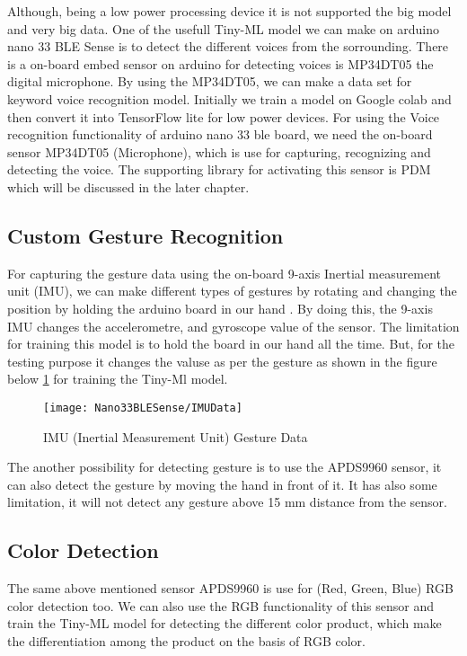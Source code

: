 Although, being a low power processing device it is not supported the big model and very big data. One of the usefull Tiny-ML model we can make on arduino nano 33 BLE Sense is to detect the different voices from the sorrounding. There is a on-board embed sensor on arduino for detecting voices is MP34DT05 the digital microphone. By using the MP34DT05, we can make a data set for keyword voice recognition model. Initially we train a model on Google colab and then convert it into TensorFlow lite for low power devices.\cite{Waqar:2021} For using the Voice recognition functionality of arduino nano 33 ble board, we need the on-board sensor MP34DT05 (Microphone), which is use for capturing, recognizing and detecting the voice. The supporting library for activating this sensor is PDM which will be discussed in the later chapter.

\subsection{Custom Gesture Recognition}

For capturing the gesture data using the on-board 9-axis Inertial measurement unit (IMU), we can make different types of gestures by rotating and changing the position by holding the arduino board in our hand . By doing this, the 9-axis IMU changes the accelerometre, and gyroscope value of the sensor. The limitation for training this model is to hold the board in our hand all the time. But, for the testing purpose it changes the valuse as per the gesture as shown in the figure below \ref{IMU Sensor Capture Data} for training the Tiny-Ml model.\cite{ArduinoNano33:2021}

\begin{figure}[ht]
	\centering
	\texttt{[image: Nano33BLESense/IMUData]}
	\caption{IMU (Inertial Measurement Unit) Gesture Data} 
	\label{IMU Sensor Capture Data}
\end{figure}

The another possibility for detecting gesture is to use the APDS9960 sensor, it can also detect the gesture by moving the hand in front of it. It has also some limitation, it will not detect any gesture above 15 mm distance from the sensor.

\subsection{Color Detection}

The same above mentioned sensor APDS9960 is use for (Red, Green, Blue) RGB color detection too. We can also use the RGB functionality of this sensor and train the Tiny-ML model for detecting the different color product, which make the differentiation among the product on the basis of RGB color.

